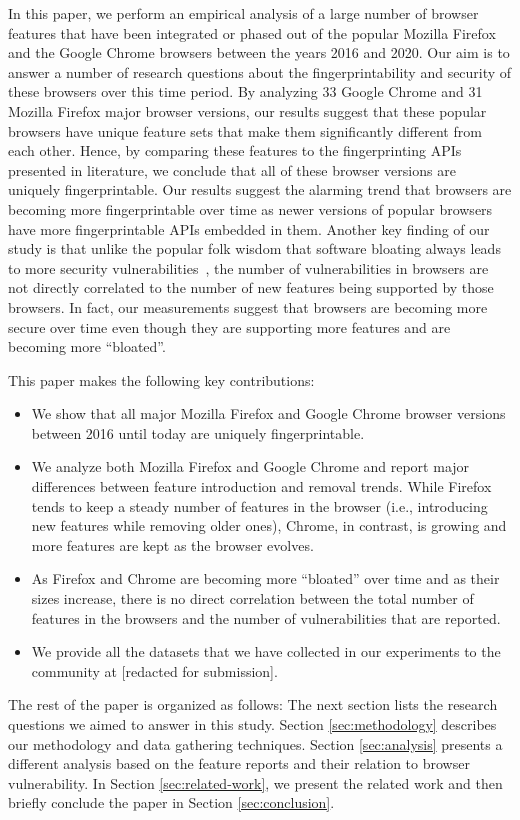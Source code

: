 In this paper, we perform an empirical analysis of a large number of
browser features that have been integrated or phased out of the
popular Mozilla Firefox and the Google Chrome browsers between the
years 2016 and 2020. Our aim is to answer a number of research
questions about the fingerprintability and security of these browsers
over this time period. By analyzing 33 Google Chrome and 31 Mozilla
Firefox major browser versions, our results suggest that these popular
browsers have unique feature sets that make them significantly
different from each other. Hence, by comparing these features to the
fingerprinting APIs presented in literature, we conclude that all of
these browser versions are uniquely fingerprintable. Our results suggest
the alarming trend that browsers are becoming more fingerprintable
over time as newer versions of popular browsers have more
fingerprintable APIs embedded in them. Another key finding of our
study is that unlike the popular folk wisdom that software bloating
always leads to more security vulnerabilities~\cite{Bloating}, the
number of vulnerabilities in browsers are not directly correlated to the
number of new features being supported by those browsers. In fact, our
measurements suggest that browsers are becoming more secure over time
even though they are supporting more features and are becoming more
``bloated''.

This paper makes the following key contributions:

\begin{itemize}

\item We show that all major Mozilla Firefox and Google Chrome browser
  versions between 2016 until today are uniquely fingerprintable.

\item We analyze both Mozilla Firefox and Google Chrome and report
  major differences between feature introduction and removal
  trends. While Firefox tends to keep a steady number of features in
  the browser (i.e., introducing new features while removing older
  ones), Chrome, in contrast, is growing and more features are kept as
  the browser evolves.

\item As Firefox and Chrome are becoming more ``bloated'' over time
  and as their sizes increase, there is no direct correlation between
  the total number of features in the browsers and the number of
  vulnerabilities that are reported.

\item We provide all the datasets that we have collected in our
  experiments to the community at [redacted for submission].
  
\end{itemize}

The rest of the paper is organized as follows: The next section lists
the research questions we aimed to answer in this study. Section
\ref{sec:methodology} describes our methodology and data gathering
techniques. Section \ref{sec:analysis} presents a different analysis
based on the feature reports and their relation to browser
vulnerability. In Section \ref{sec:related-work}, we present the
related work and then briefly conclude the paper in Section
\ref{sec:conclusion}.
